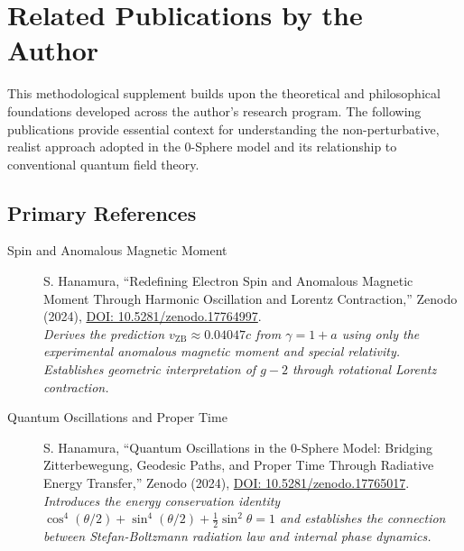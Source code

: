 \documentclass[12pt,letterpaper]{article}
\begin{document}
\section*{Related Publications by the Author}

This methodological supplement builds upon the theoretical and philosophical foundations developed across the author's research program. The following publications provide essential context for understanding the non-perturbative, realist approach adopted in the 0-Sphere model and its relationship to conventional quantum field theory.

\subsection*{Primary References}

\begin{description}
\item[Spin and Anomalous Magnetic Moment] S. Hanamura, ``Redefining Electron Spin and Anomalous Magnetic Moment Through Harmonic Oscillation and Lorentz Contraction,'' Zenodo (2024), \href{https://doi.org/10.5281/zenodo.17764997}{DOI: 10.5281/zenodo.17764997}. \\
\textit{Derives the prediction $v_{\mathrm{ZB}} \approx 0.04047c$ from $\gamma = 1 + a$ using only the experimental anomalous magnetic moment and special relativity. Establishes geometric interpretation of $g-2$ through rotational Lorentz contraction.}

\item[Quantum Oscillations and Proper Time] S. Hanamura, ``Quantum Oscillations in the 0-Sphere Model: Bridging Zitterbewegung, Geodesic Paths, and Proper Time Through Radiative Energy Transfer,'' Zenodo (2024), \href{https://doi.org/10.5281/zenodo.17765017}{DOI: 10.5281/zenodo.17765017}. \\
\textit{Introduces the energy conservation identity $\cos^4(\theta/2) + \sin^4(\theta/2) + \frac{1}{2}\sin^2\theta = 1$ and establishes the connection between Stefan-Boltzmann radiation law and internal phase dynamics.}
\end{description}

\end{document}
